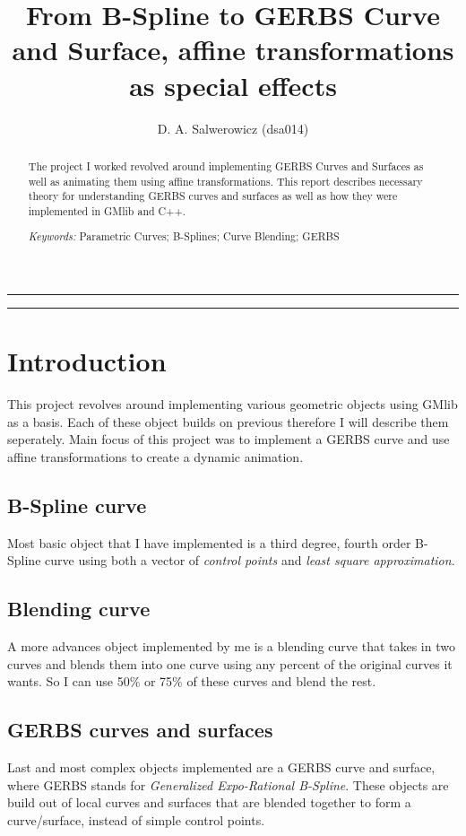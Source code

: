 \documentclass[a4paper,12pt]{extarticle}
\title{From B-Spline to GERBS Curve and Surface, affine transformations as special effects}
\author{D. A. Salwerowicz (dsa014)}
\date{\parbox{\linewidth}{\centering
    \textit{\small UiT - The Arctic University of Norway, P.O. Box 385, N-8505 Narvik, Norway}\endgraf\bigskip
    \small Submitted \today
}}
\providecommand{\keywords}[1]{\flushleft\textit{\small{Keywords:}} #1}
\begin{document}
  
\maketitle

\noindent\rule{\linewidth}{.5pt}
\begin{abstract} 
The project I worked revolved around implementing GERBS Curves and Surfaces as well as animating them using affine transformations. This report describes necessary theory for understanding GERBS curves and surfaces as well as how they were implemented in GMlib and C++.

\keywords{Parametric Curves; B-Splines; Curve Blending; GERBS}
\end{abstract}
\rule{\linewidth}{.5pt}


\section{Introduction}
This project revolves around implementing various geometric objects using GMlib as a basis. Each of these object builds on previous therefore I will describe them seperately. Main focus of this project was to implement a GERBS curve and use affine transformations to create a dynamic animation.

\subsection{B-Spline curve}
Most basic object that I have implemented is a third degree, fourth order B-Spline curve using both a vector of \emph{control points} and \emph{least square approximation}.

\subsection{Blending curve}
A more advances object implemented by me is a blending curve that takes in two curves and blends them into one curve using any percent of the original curves it wants. So I can use 50\% or 75\% of these curves and blend the rest.

\subsection{GERBS curves and surfaces}
Last and most complex objects implemented are a GERBS curve and surface, where GERBS stands for \emph{Generalized Expo-Rational B-Spline}. These objects are build out of local curves and surfaces that are blended together to form a curve/surface, instead of simple control points.
\end{document}
